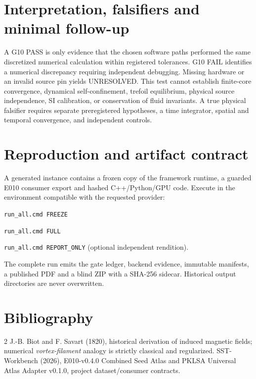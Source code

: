 \documentclass[11pt,a4paper]{article}
\begin{document}
\section{Interpretation, falsifiers and minimal follow-up}
A G10 PASS is only evidence that the chosen software paths performed the same discretized numerical calculation within registered tolerances. G10 FAIL identifies a numerical discrepancy requiring independent debugging. Missing hardware or an invalid source pin yields UNRESOLVED. This test cannot establish finite-core convergence, dynamical self-confinement, trefoil equilibrium, physical source independence, SI calibration, or conservation of fluid invariants. A true physical falsifier requires separate preregistered hypotheses, a time integrator, spatial and temporal convergence, and independent controls.
\section{Reproduction and artifact contract}
A generated instance contains a frozen copy of the framework runtime, a guarded E010 consumer export and hashed C++/Python/GPU code. Execute in the environment compatible with the requested provider:\par
\texttt{run\_all.cmd FREEZE}\par
\texttt{run\_all.cmd FULL}\par
\texttt{run\_all.cmd REPORT\_ONLY} (optional independent rendition).\par
The complete run emits the gate ledger, backend evidence, immutable manifests, a published PDF and a blind ZIP with a SHA-256 sidecar. Historical output directories are never overwritten.
\section{Bibliography}
\begin{thebibliography}{2}
 J.-B. Biot and F. Savart (1820), historical derivation of induced magnetic fields; numerical \emph{vortex-filament} analogy is strictly classical and regularized.
 SST-Workbench (2026), E010-v0.4.0 Combined Seed Atlas and PKLSA Universal Atlas Adapter v0.1.0, project dataset/consumer contracts.
\end{thebibliography}
\end{document}
